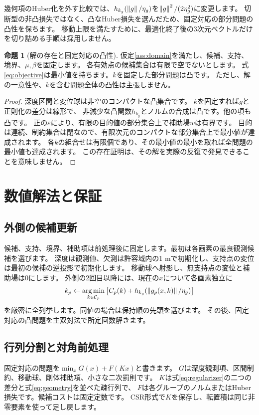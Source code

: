 \documentclass[a4paper,11pt]{ltjsarticle}
\theoremstyle{definition}
\newtheorem{proposition}[definition]{命題}\newtheorem{remark}[definition]{注意}
\begin{document}
幾何項のHuber化を外す比較では、$h_{k_g}(\left\lVert g\right\rVert/\eta_g)$を$\left\lVert g\right\rVert^2/(2\eta_g^2)$に変更します。
切断型の非凸損失ではなく、凸なHuber損失を選んだため、固定対応の部分問題の凸性を保ちます。
移動上限を満たすために、最適化終了後の3次元ベクトルだけを切り詰める手順は採用しません。

\begin{proposition}[解の存在と固定対応の凸性]\label{prop:convex}
仮定\ref{ass:domain}を満たし、候補、支持、境界、$\mu,\beta$を固定します。
各有効点の候補集合は有限で空でないとします。
式\eqref{eq:objective}は最小値を持ちます。$k$を固定した部分問題は凸です。
ただし、解の一意性や、$k$を含む問題全体の凸性は主張しません。
\end{proposition}
\begin{proof}
深度区間と変位球は非空のコンパクトな凸集合です。
$k$を固定すれば$g$と正則化の差分は線形で、
非減少な凸関数$h_{k_g}$とノルムの合成は凸です。他の項も凸です。
正の$\varepsilon$により、有限の目的値の部分集合上で補助場$w$は有界です。
目的は連続、制約集合は閉なので、有限次元のコンパクトな部分集合上で最小値が達成されます。
各$k$の組合せは有限個であり、その最小値の最小を取れば全問題の最小値も達成されます。
この存在証明は、その解を実際の反復で発見できることを意味しません。
\end{proof}

\section{数値解法と保証}
\subsection{外側の候補更新}
候補、支持、境界、補助項は前処理後に固定します。最初は各画素の最良観測候補を選びます。
深度は観測値、欠測は許容域内の1 mで初期化し、支持点の変位は最初の候補の逆投影で初期化します。
移動球へ射影し、無支持点の変位と補助場は0にします。
外側の2回目以降には、現在の$x$について各画素独立に
\begin{equation}\label{eq:discrete_update}
k_p\leftarrow\operatorname*{arg\,min}_{k\in\mathcal C_p}
 \left[C_p(k)+h_{k_g}(\left\lVert g_p(x,k)\right\rVert/\eta_g)\right]
\end{equation}
を厳密に全列挙します。同値の場合は保持順の先頭を選びます。
その後、固定対応の凸問題を主双対法で所定回数解きます。

\subsection{行列分割と対角前処理}
固定対応の問題を$\min_x G(x)+F(Kx)$と書きます。
$G$は深度観測項、区間制約、移動球、剛体補助項、小さな二次罰則です。
$K$は式\eqref{eq:regularizer}の二つの差分と式\eqref{eq:geometry}を並べた疎行列で、
$F$は各グループのノルムまたはHuber損失です。候補コストは固定定数です。
CSR形式で$K$を保存し、転置積は同じ非零要素を使って足し戻します。
\end{document}
